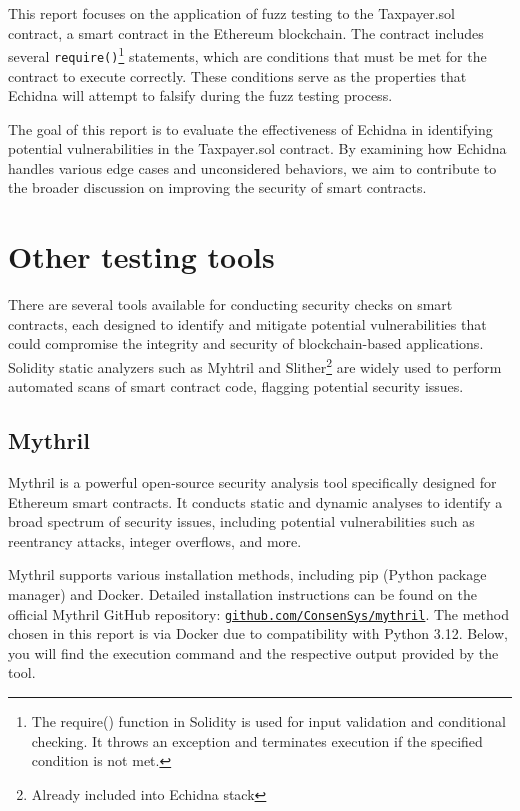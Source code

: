 \documentclass{article}
\begin{document}
This report focuses on the application of fuzz testing to 
the Taxpayer.sol contract, a smart contract in the Ethereum blockchain. 
The contract includes several \texttt{require()}\footnote{The require() function in Solidity is used for input validation and conditional checking. It throws an exception and terminates execution if the specified condition is not met.} statements, which are 
conditions that must be met for the contract to execute correctly. 
These conditions serve as the properties that Echidna will attempt to 
falsify during the fuzz testing process.

The goal of this report is to evaluate the effectiveness of Echidna 
in identifying potential vulnerabilities in the Taxpayer.sol contract. 
By examining how Echidna handles various edge cases and unconsidered 
behaviors, we aim to contribute to the broader discussion on improving 
the security of smart contracts.

\section{Other testing tools}
There are several tools available for conducting security checks on smart contracts, each designed to identify and mitigate potential vulnerabilities that could compromise the integrity and security of blockchain-based applications. Solidity static analyzers such as Myhtril and Slither\footnote{Already included into Echidna stack} are widely used to perform automated scans of smart contract code, flagging potential security issues. 
\subsection{Mythril}
Mythril is a powerful open-source security analysis tool specifically designed for Ethereum smart contracts. It conducts static and dynamic analyses to identify a broad spectrum of security issues, including potential vulnerabilities such as reentrancy attacks, integer overflows, and more.

Mythril supports various installation methods, including pip (Python package manager) and Docker.
Detailed installation instructions can be found on the official Mythril GitHub repository: \texttt{\href{https://github.com/ConsenSys/mythril}{github.com/ConsenSys/mythril}}.
The method chosen in this report is via Docker due to compatibility with Python 3.12.
Below, you will find the execution command and the respective output provided by the tool.
\end{document}
